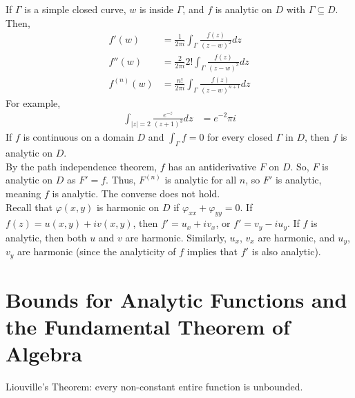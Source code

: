 \documentclass[10pt]{extarticle}
\begin{document}
  If $\Gamma$ is a simple closed curve, $w$ is inside $\Gamma$, and $f$ is analytic on $D$ with $\Gamma \subseteq D$. Then,
  \begin{align*}
    f'(w) &= \frac{1}{2\pi i}\int_{\Gamma}\frac{f(z)}{(z-w)^2}dz\\
    f''(w) &= \frac{2}{2\pi i}2! \int_{\Gamma}\frac{f(z)}{(z-w)^3}dz\\
    f^{(n)}(w) &= \frac{n!}{2\pi i}\int_{\Gamma}\frac{f(z)}{(z-w)^{n+1}}dz
  \end{align*}
  For example,
  \begin{align*}
    \int_{|z|=2}\frac{e^{-z}}{(z+1)^3}dz &= e^{-2}\pi i
  \end{align*}
  If $f$ is continuous on a domain $D$ and $\int_{\Gamma}f = 0$ for every closed $\Gamma$ in $D$, then $f$ is analytic on $D$.\\

  By the path independence theorem, $f$ has an antiderivative $F$ on $D$. So, $F$ is analytic on $D$ as $F' = f$. Thus, $F^{(n)}$ is analytic for all $n$, so $F'$ is analytic, meaning $f$ is analytic. The converse does not hold.\\

  Recall that $\varphi(x,y)$ is harmonic on $D$ if $\varphi_{xx} + \varphi_{yy} = 0$. If $f(z) = u(x,y) + iv(x,y)$, then $f' = u_x + iv_x$, or $f' = v_y - iu_y$. If $f$ is analytic, then both $u$ and $v$ are harmonic. Similarly, $u_x$, $v_x$ are harmonic, and $u_y$, $v_y$ are harmonic (since the analyticity of $f$ implies that $f'$ is also analytic).
  \section{Bounds for Analytic Functions and the Fundamental Theorem of Algebra}%
  Liouville's Theorem: every non-constant entire function is unbounded.\\
\end{document}
